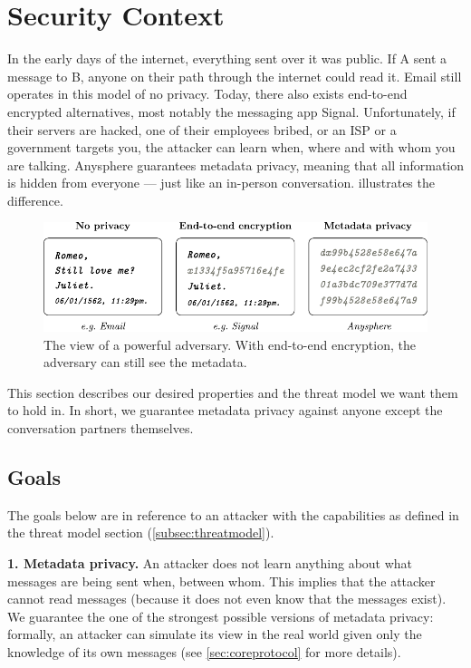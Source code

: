 \section{Security Context}
\label{sec:securitycontext}



In the early days of the internet, everything sent over it was public. If A sent a message to B, anyone on their path through the internet could read it. Email still operates in this model of no privacy. Today, there also exists end-to-end encrypted alternatives, most notably the messaging app Signal. Unfortunately, if their servers are hacked, one of their employees bribed, or an ISP or a government targets you, the attacker can learn when, where and with whom you are talking. Anysphere guarantees metadata privacy, meaning that all information is hidden from everyone — just like an in-person conversation.  illustrates the difference.

\begin{figure}[h!]
    \centering
        \includegraphics[width=\textwidth]{metadata-privacy.pdf}
\caption{The view of a powerful adversary. With end-to-end encryption, the adversary can still see the metadata.}
\label{fig:metadataprivacy}
\end{figure}

This section describes our desired properties and the threat model we want them to hold in. In short, we guarantee metadata privacy against anyone except the conversation partners themselves.

\subsection{Goals}

The goals below are in reference to an attacker with the capabilities as defined in the threat model section (\cref{subsec:threatmodel}).

\textbf{1. Metadata privacy.} An attacker does not learn anything about what messages are being sent when, between whom. This implies that the attacker cannot read messages (because it does not even know that the messages exist). We guarantee the one of the strongest possible versions of metadata privacy: formally, an attacker can simulate its view in the real world given only the knowledge of its own messages (see \cref{sec:coreprotocol} for more details).

